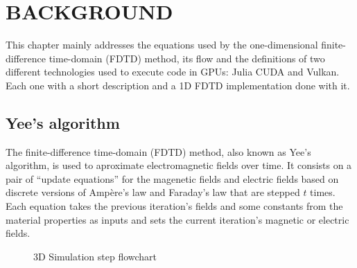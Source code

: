 \documentclass[../main.tex]{subfiles}
\begin{document}
\newpage
\chapter{BACKGROUND}

This chapter mainly addresses the equations used by the one-dimensional finite-difference time-domain (FDTD) method, its flow and the definitions of two different technologies used to execute code in GPUs: Julia CUDA and Vulkan. Each one with a short description and a 1D FDTD implementation done with it.

\section{Yee's algorithm}

The finite-difference time-domain (FDTD) method\cite{ufdtd}, also known as Yee's algorithm, is used to aproximate electromagnetic fields over time.
It consists on a pair of ``update equations'' for the  magenetic fields and  electric fields based on discrete versions of Ampère's law and Faraday's law that are stepped $t$ times.
Each equation takes the previous iteration's fields and some constants from the material properties as inputs and sets the current iteration's magnetic or electric fields.


\begin{figure}[H]
	\centering
	\caption{3D Simulation step flowchart}
	\label{fig:fdtd_lucuma_step}
\end{figure}
\end{document}
